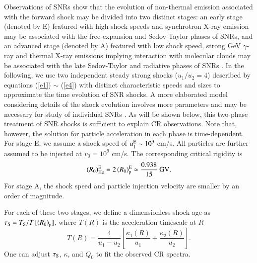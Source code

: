 \documentclass[apj]{emulateapj}
\begin{document}
Observations of SNRs show that the evolution of non-thermal emission associated with the forward shock may be divided into two distinct stages: an early stage (denoted by E) featured with high shock speeds and synchrotron X-ray emission may be associated with the free-expansion and Sedov-Taylor phases of SNRs, and an advanced stage (denoted by A) featured with low shock speed, strong GeV $\gamma$-ray and thermal X-ray emissions implying interaction with molecular clouds may be associated with the late Sedov-Taylor and radiative phases of SNRs \citep{Helder2012, 2017ApJ...834..153Z}. In the following, we use two independent steady strong shocks ($ u_1/u_2=4 $) described by equations (\ref{e1}) $ \sim $ (\ref{e4}) with distinct characteristic speeds and sizes to approximate the time evolution of SNR shocks. A more elaborated model considering details of the shock evolution involves more parameters and may be necessary for study of individual SNRs \citep{2010ApJ...708..965Z}. As will be shown below, this two-phase treatment of SNR shocks is sufficient to explain CR observations. Note that, however, the solution for particle acceleration in each phase is time-dependent. For stage E, we assume a shock speed of $u_1^{\rm E}\sim 10^9$ cm/s. All particles are further assumed to be injected at $v_0=10^9$ cm/s. The corresponding critical rigidity is
\begin{equation}
\left( R_0 \right) _{\textrm{\scriptsize He}}^{\textrm{\scriptsize E}}=2\left( R_0 \right) _{\textrm{\scriptsize p}}^{\textrm{\scriptsize E}}\approx \frac{0.938}{15}\ \textrm{GV}.\label{28}
\end{equation}
For stage A, the shock speed and particle injection velocity are smaller by an order of magnitude.

For each of these two stages, we define a dimensionless shock age as $\tau_\textrm{\scriptsize S}= T_\textrm{\scriptsize S}/T\,[\left( R_0\right)_{\rm p}] $, where $ T\left( R\right) $ is the acceleration timescale at $ R $ \citep{1983RPPh...46..973D}
\begin{equation}
T\left( R \right) =\frac{4}{u_1-u_2}\left[ \frac{\kappa _1\left( R\right)}{u_1}+\frac{\kappa _2\left( R\right)}{u_2} \right]. \label{time_R0}
\end{equation}
One can adjust $\tau_\textrm{\scriptsize S}$, $\kappa$, and $Q_0$ to fit the observed CR spectra.
\end{document}
